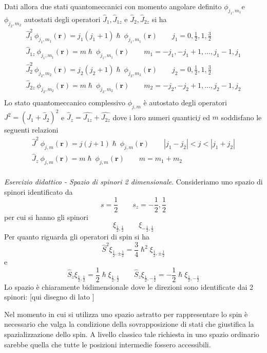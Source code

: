 Dati allora due stati quantomeccanici con momento angolare definito
\(\phi_{j_{1},m_{1}}\)e \(\phi_{j_{2},m_{2}}\) autostati degli operatori
\(\hat{J}_{1},\hat{J}_{1z}\) e \(\hat{J}_{2}, \hat{J}_{2z}\) si ha \begin{gather*}
	\hat{J}_{1}^{2} \ \phi_{j_{1},m_{1}}(\bm{r}) = j_{1}(j_{1}+1) \hslash \ \phi_{j_{1},m_{1}}(\bm{r}) \qquad j_{1} = 0, \frac{1}{2}, 1, \frac{3}{2}\\
	\hat{J}_{1z} \ \phi_{j_{1},m_{1}}(\bm{r}) = m \hslash \ \phi_{j_{1},m_{1}}(\bm{r})  \qquad m_{1} = -j_{1} , -j_{1} +1, \dots , j_{1}-1, j_{1}\\
	\hat{J}_{2}^{2} \ \phi_{j_{2},m_{2}}(\bm{r}) = j_{2}(j_{2}+1) \hslash \ \phi_{j_{2},m_{2}}(\bm{r}) \qquad j_{2} = 0, \frac{1}{2}, 1, \frac{3}{2}\\
	\hat{J}_{2z} \ \phi_{j_{2},m_{2}}(\bm{r}) = m \hslash \ \phi_{j_{2},m_{2}}(\bm{r})  \qquad m_{2} = -j_{2} , -j_{2} +1, \dots , j_{2}-1, j_{2}\\
\end{gather*} Lo stato quantomeccanico complessivo \(\phi_{j,m}\) è autostato degli
operatori \(J^{2} = (J_{1} + \hat{J}_{2})^{2}\) e
\(\hat{J}_{z} = \hat{J_{1z}} + \hat{J_{2z}}\) dove i loro numeri
quantici\(j\) ed \(m\) soddisfano le seguenti relazioni \begin{gather*}
	\hat{J}^{2} \ \phi_{j,m}(\bm{r}) = j(j+1) \hslash \ \phi_{j,m}(\bm{r}) \qquad | j_{1} - j_{2}|<j<|j_{1}+j_{2}|\\
	\hat{J}_{z} \ \phi_{j,m}(\bm{r}) = m \hslash \ \phi_{j,m}(\bm{r})  \qquad m = m_{1}+m_{2}\\
\end{gather*}

\emph{Esercizio didattico - Spazio di spinori 2 dimensionale}.
Consideriamo uno spazio di spinori identificato da \[
	s = \frac{1}{2} \qquad s_{z} = - \frac{1}{2} , \frac{1}{2}
\] per cui si hanno gli spinori \[
	\xi_{\frac{1}{2}, \frac{1}{2}} \qquad \xi_{- \frac{1}{2}, \frac{1}{2}}
\] Per quanto riguarda gli operatori di spin si ha \[
	\hat{S}^{2} \xi_{\frac{1}{2}, \pm \frac{1}{2}} = \frac{3}{4} \hslash^{2} \xi_{\frac{1}{2}, \pm \frac{1}{2}}
\] e \[
	\hat{S}_{z} \xi_{\frac{1}{2}, \frac{1}{2}} = \frac{1}{2} \hslash \xi_{\frac{1}{2}, \frac{1}{2}} \qquad
	\hat{S}_{z} \xi_{\frac{1}{2}, - \frac{1}{2}} = - \frac{1}{2} \hslash \xi_{\frac{1}{2}, -\frac{1}{2}}
\] Lo spazio è chiaramente bidimensionale dove le direzioni sono
identificate dai 2 spinori: {[}qui disegno di lato {]}

Nel momento in cui si utilizza uno spazio astratto per rappresentare lo
spin è necessario che valga la condizione della sovrapposizione di stati
che giustifica la spazializzazione dello spin.
A livello classico tale
richiesta in uno spazio ordinario sarebbe quella che tutte le posizioni
intermedie fossero accessibili.

